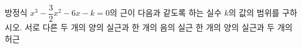 방정식 $x^3-\dfrac{3}{2}x^2-6x-k=0$의 근이 다음과 같도록 하는 실수 $k$의 값의 범위를 구하시오.
 서로 다른 두 개의 양의 실근과 한 개의 음의 실근
 한 개의 양의 실근과 두 개의 허근
